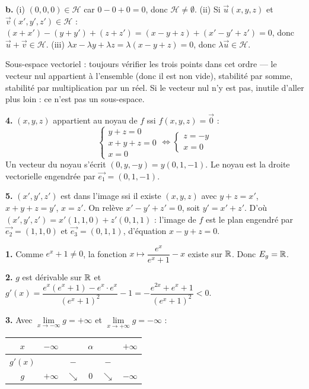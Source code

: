 \documentclass[11pt]{article}
\begin{document}
\textbf{b.} (i) $(0,0,0) \in \mathscr{H}$ car $0 - 0 + 0 = 0$, donc $\mathscr{H} \ne \emptyset$. (ii) Si $\vec{u}(x,y,z)$ et $\vec{v}(x',y',z') \in \mathscr{H}$ : $(x+x') - (y+y') + (z+z') = (x-y+z) + (x'-y'+z') = 0$, donc $\vec{u}+\vec{v} \in \mathscr{H}$. (iii) $\lambda x - \lambda y + \lambda z = \lambda(x-y+z) = 0$, donc $\lambda\vec{u} \in \mathscr{H}$.

\begin{methode}
Sous-espace vectoriel : toujours vérifier les trois points dans cet
ordre — le vecteur nul appartient à l'ensemble (donc il est non vide),
stabilité par somme, stabilité par multiplication par un réel. Si le
vecteur nul n'y est pas, inutile d'aller plus loin : ce n'est pas un
sous-espace.
\end{methode}

\textbf{4.} $(x,y,z)$ appartient au noyau de $f$ ssi $f(x,y,z) = \vec{0}$ :
\[ \begin{cases} y + z = 0 \\ x + y + z = 0 \\ x = 0 \end{cases} \Longleftrightarrow \begin{cases} z = -y \\ x = 0 \end{cases} \]
Un vecteur du noyau s'écrit $(0, y, -y) = y(0, 1, -1)$. Le noyau est la droite vectorielle engendrée par $\vec{e_1} = (0, 1, -1)$.

\textbf{5.} $(x',y',z')$ est dans l'image ssi il existe $(x,y,z)$ avec $y+z=x'$, $x+y+z=y'$, $x=z'$. On relève $x' - y' + z' = 0$, soit $y' = x' + z'$. D'où $(x',y',z') = x'(1,1,0) + z'(0,1,1)$ : l'image de $f$ est le plan engendré par $\vec{e_2} = (1,1,0)$ et $\vec{e_3} = (0,1,1)$, d'équation $x - y + z = 0$.

\textbf{1.} Comme $e^x + 1 \ne 0$, la fonction $x \mapsto \dfrac{e^x}{e^x + 1} - x$ existe sur $\mathbb{R}$. Donc $E_g = \mathbb{R}$.

\textbf{2.} $g$ est dérivable sur $\mathbb{R}$ et $g'(x) = \dfrac{e^x(e^x+1) - e^x\cdot e^x}{(e^x+1)^2} - 1 = -\dfrac{e^{2x} + e^x + 1}{(e^x+1)^2} < 0$.

\textbf{3.} Avec $\lim\limits_{x\to-\infty} g = +\infty$ et $\lim\limits_{x\to+\infty} g = -\infty$ :
\begin{center}\renewcommand{\arraystretch}{1.4}
\begin{tabular}{|c|ccccc|}
\hline $x$ & $-\infty$ & & $\alpha$ & & $+\infty$ \\\hline $g'(x)$ & & $-$ & & $-$ & \\\hline $g$ & $+\infty$ & $\searrow$ & $0$ & $\searrow$ & $-\infty$ \\\hline
\end{tabular}
\end{center}
\end{document}
